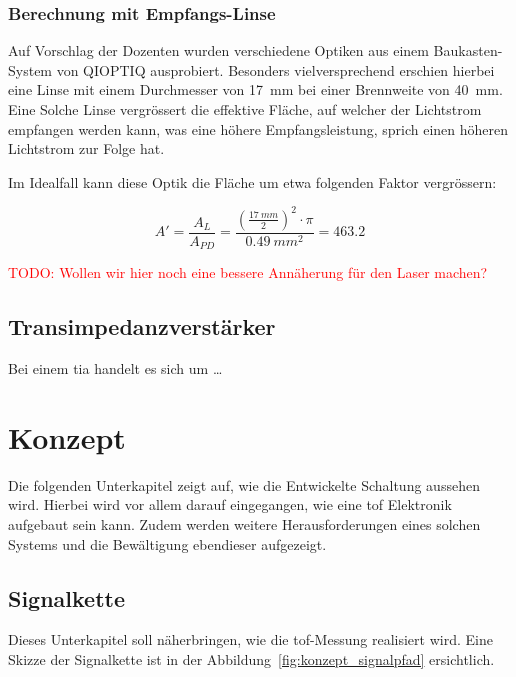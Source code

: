 \documentclass[11pt,a4paper,hidelinks]{article}
\begin{document}
\subsubsection{Berechnung mit Empfangs-Linse}

Auf Vorschlag der Dozenten wurden verschiedene Optiken aus einem Baukasten-System von QIOPTIQ ausprobiert.
Besonders vielversprechend erschien hierbei eine Linse mit einem Durchmesser von 17~mm bei einer Brennweite von
40~mm. Eine Solche Linse vergrössert die effektive Fläche, auf welcher der Lichtstrom empfangen werden kann, was
eine höhere Empfangsleistung, sprich einen höheren Lichtstrom zur Folge hat.

Im Idealfall kann diese Optik die Fläche um etwa folgenden Faktor vergrössern:

\begin{equation}\label{eq:njl6401r3_lens}
    A' = \frac{A_{L}}{A_{PD}} = \frac{(\frac{17~mm}{2})^2 \cdot \pi}{0.49~mm^2} = 463.2
\end{equation}

\textcolor{red}{TODO: Wollen wir hier noch eine bessere Annäherung für den Laser machen?}

\pagebreak

\subsection{Transimpedanzverstärker}

Bei einem \acrfull{tia} handelt es sich um \dots

\pagebreak


\section{Konzept}

Die folgenden Unterkapitel zeigt auf, wie die Entwickelte Schaltung aussehen wird. Hierbei wird vor allem darauf eingegangen,
wie eine \acrlong{tof} Elektronik aufgebaut sein kann. Zudem werden weitere Herausforderungen eines solchen Systems und die
Bewältigung ebendieser aufgezeigt.

\subsection{Signalkette}

Dieses Unterkapitel soll näherbringen, wie die \acrshort{tof}-Messung realisiert wird. Eine Skizze der Signalkette ist in der
Abbildung~\ref{fig:konzept_signalpfad} ersichtlich.
\end{document}
